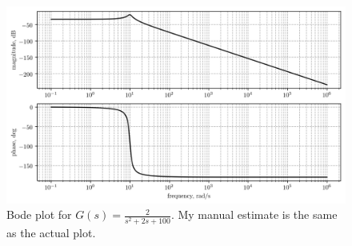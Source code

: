 \documentclass[12pt,a4paper]{article}
\begin{document}
\begin{figure}[!h]
	\centering
	\includegraphics[width=\linewidth]{8.png}
	\caption{Bode plot for $G(s) = \frac{2}{s^2+2s+100}$. My manual estimate is the same as the actual plot.}
\end{figure}
\end{document}

